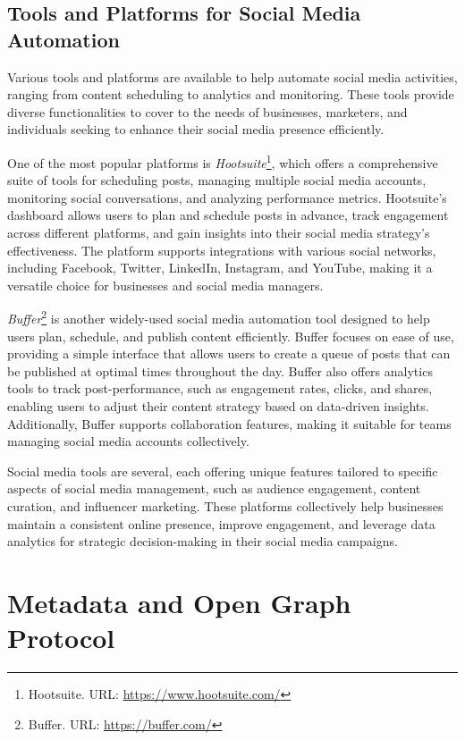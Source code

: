 \subsection{Tools and Platforms for Social Media Automation}
\label{subsec:tools_and_platforms_for_social_media_automation}
Various tools and platforms are available to help automate social media activities, ranging from content scheduling to analytics and monitoring.
These tools provide diverse functionalities to cover to the needs of businesses, marketers, and individuals seeking to enhance their social media presence efficiently.

One of the most popular platforms is \textit{Hootsuite}\footnote{Hootsuite. URL: \url{https://www.hootsuite.com/}}, which offers a comprehensive suite of tools for scheduling posts, managing multiple social media accounts, monitoring social conversations, and analyzing performance metrics.
Hootsuite's dashboard allows users to plan and schedule posts in advance, track engagement across different platforms, and gain insights into their social media strategy's effectiveness.
The platform supports integrations with various social networks, including Facebook, Twitter, LinkedIn, Instagram, and YouTube, making it a versatile choice for businesses and social media managers.

\textit{Buffer}\footnote{Buffer. URL: \url{https://buffer.com/}} is another widely-used social media automation tool designed to help users plan, schedule, and publish content efficiently.
Buffer focuses on ease of use, providing a simple interface that allows users to create a queue of posts that can be published at optimal times throughout the day.
Buffer also offers analytics tools to track post-performance, such as engagement rates, clicks, and shares, enabling users to adjust their content strategy based on data-driven insights.
Additionally, Buffer supports collaboration features, making it suitable for teams managing social media accounts collectively.

Social media tools are several, each offering unique features tailored to specific aspects of social media management, such as audience engagement, content curation, and influencer marketing.
These platforms collectively help businesses maintain a consistent online presence, improve engagement, and leverage data analytics for strategic decision-making in their social media campaigns.


\section{Metadata and Open Graph Protocol}
\label{sec:metadata_and_open_graph_protocol}

